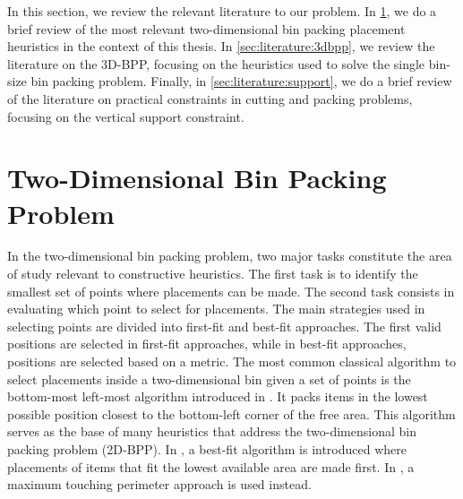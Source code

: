In this section, we review the relevant literature to our problem. 
In \cref{sec:literature:2dbpp}, we do a brief review of the most relevant two-dimensional bin packing placement heuristics in the context of this thesis.
In \cref{sec:literature:3dbpp}, we review the literature on the 3D-BPP, focusing on the heuristics used to solve the single bin-size bin packing problem.
Finally, in \cref{sec:literature:support}, we do a brief review of the literature on practical constraints in cutting and packing problems, focusing on the vertical support constraint.

\section{Two-Dimensional Bin Packing Problem}
\label{sec:literature:2dbpp}%
In the two-dimensional bin packing problem, two major tasks constitute the area of study relevant to constructive heuristics. 
The first task is to identify the smallest set of points where placements can be made.
The second task consists in evaluating which point to select for placements. The main strategies used in selecting points are divided into first-fit and best-fit approaches.
The first valid positions are selected in first-fit approaches, while in best-fit approaches, positions are selected based on a metric.
The most common classical algorithm to select placements inside a two-dimensional bin given a set of points is the bottom-most left-most algorithm introduced in \cite{Baker1980}. 
It packs items in the lowest possible position closest to the bottom-left corner of the free area. 
This algorithm serves as the base of many heuristics that address the two-dimensional bin packing problem (2D-BPP).
In \cite{burke2004new}, a best-fit algorithm is introduced where placements of items that fit the lowest available area are made first.
In \cite{lodi1999heuristic}, a maximum touching perimeter approach is used instead.

